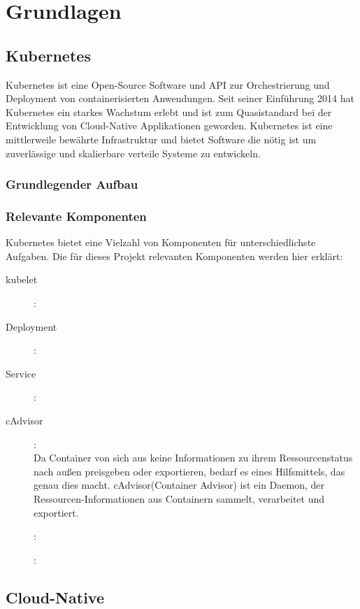 \documentclass[a4paper,12pt]{scrartcl}
\begin{document}
\section{Grundlagen}
\subsection{Kubernetes}

Kubernetes ist eine Open-Source Software und API zur Orchestrierung und Deployment von containerisierten Anwendungen. Seit seiner Einführung 2014 hat Kubernetes ein starkes Wachstum erlebt und ist zum Quasistandard bei der Entwicklung von Cloud-Native Applikationen geworden. Kubernetes ist eine mittlerweile bewährte Infrastruktur und bietet Software die nötig ist um zuverlässige und skalierbare verteile Systeme zu entwickeln. \cite{Burns.2019}

\subsubsection{Grundlegender Aufbau}



\subsubsection{Relevante Komponenten}

Kubernetes bietet eine Vielzahl von Komponenten für unterschiedlichste Aufgaben. Die für dieses Projekt relevanten Komponenten werden hier erklärt:

\begin{description}



\item [kubelet]:
\item [Deployment]:
\item [Service]:
\item [cAdvisor]:\\
Da Container von sich aus keine Informationen zu ihrem Ressourcenstatus nach außen preisgeben oder exportieren, bedarf es eines Hilfsmittels, das genau dies macht.
cAdvisor(Container Advisor) ist ein Daemon, der Ressourcen-Informationen aus Containern sammelt, verarbeitet und exportiert.\cite{.20200704T23:29:24.000Z}
\item []:
\item []:

\end{description}

\subsection{Cloud-Native}
\end{document}
